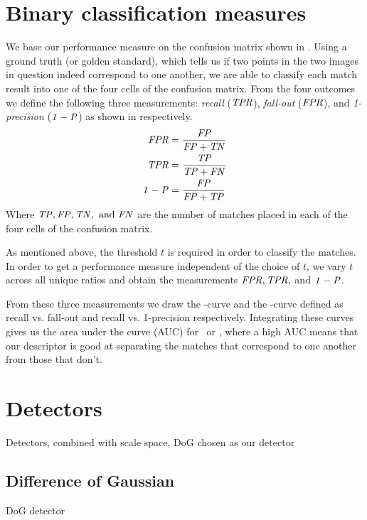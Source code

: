 \documentclass[thesis.tex]{subfiles}
\begin{document}
\section{Binary classification measures}

We base our performance measure on the confusion matrix shown in . Using a ground truth (or golden standard), which tells us if two points in the two images in question indeed correspond to one another, we are able to classify each match result into one of the four cells of the confusion matrix. From the four outcomes we define the following three measurements: \emph{recall} ($\mathit{TPR}$), \emph{fall-out} ($\mathit{FPR}$), and \emph{1-precision} ($\mathit{1-P}$) as shown in  respectively.
\begin{align}
	\label{eq:fpr}
	\mathit{FPR} &= \frac{\mathit{FP}}{\mathit{FP} + \mathit{TN}} \\
	\label{eq:tpr}
	\mathit{TPR} &= \frac{\mathit{TP}}{\mathit{TP} + \mathit{FN}} \\
	\label{eq:omp}
	\mathit{1-P} &= \frac{\mathit{FP}}{\mathit{FP} + \mathit{TP}}
\end{align}
Where $\mathit{TP},\mathit{FP},\mathit{TN},~\text{and}~\mathit{FN}$ are the number of matches placed in each of the four cells of the confusion matrix.

As mentioned above, the threshold $t$ is required in order to classify the matches. In order to get a performance measure independent of the choice of $t$, we vary $t$ across all unique ratios and obtain the measurements $\mathit{FPR},\mathit{TPR},$ and $\mathit{1-P}$.

From these three measurements we draw the \ROC-curve and the \PR-curve defined as recall vs. fall-out and recall vs. 1-precision respectively. Integrating these curves gives us the area under the curve (AUC) for \ROC\ or \PR, where a high AUC means that our descriptor is good at separating the matches that correspond to one another from those that don't.

\section{Detectors}
Detectors, combined with scale space, DoG chosen as our detector

\subsection{Difference of Gaussian}
DoG detector
\end{document}
